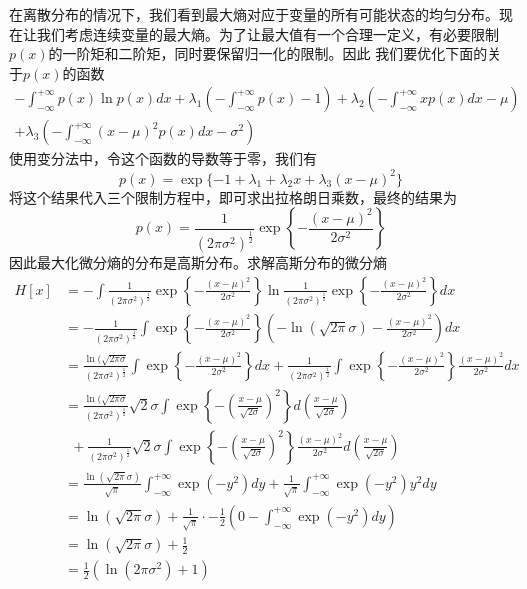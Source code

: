 在离散分布的情况下，我们看到最大熵对应于变量的所有可能状态的均匀分布。现在让我们考虑连续变量的最大熵。为了让最大值有一个合理一定义，有必要限制$p(x)$的一阶矩和二阶矩，同时要保留归一化的限制。因此
我们要优化下面的关于$p(x)$的函数
\begin{equation}
	\begin{aligned}
		-\int_{-\infty}^{+\infty}p(x)\ln p(x)dx+\lambda_1\left(-\int_{-\infty}^{+\infty}p(x)-1 \right)
		+\lambda_2\left(-\int_{-\infty}^{+\infty}xp(x)dx-\mu \right)\\+\lambda_3\left(-\int_{-\infty}^{+\infty}(x-\mu)^2p(x)dx -\sigma^2\right)
	\end{aligned}
\end{equation}
使用变分法中，令这个函数的导数等于零，我们有
\begin{equation}
	p(x)=\exp\{-1+\lambda_1+\lambda_2x+\lambda_3(x-\mu)^2\}
\end{equation}
将这个结果代入三个限制方程中，即可求出拉格朗日乘数，最终的结果为
\begin{equation}
	p(x)=\frac{1}{(2\pi\sigma^2)^{\frac{1}{2}}}\exp\left\{-\frac{(x-\mu)^2}{2\sigma^2} \right\}
\end{equation}
因此最大化微分熵的分布是高斯分布。求解高斯分布的微分熵
\begin{equation}
	\begin{aligned}
		H[x]&=-\int \frac{1}{(2\pi\sigma^2)^{\frac{1}{2}}}\exp\left\{-\frac{(x-\mu)^2}{2\sigma^2} \right\}\ln \frac{1}{(2\pi\sigma^2)^{\frac{1}{2}}}\exp\left\{-\frac{(x-\mu)^2}{2\sigma^2} \right\}dx\\
		&=-\frac{1}{(2\pi\sigma^2)^{\frac{1}{2}}}\int \exp\left\{-\frac{(x-\mu)^2}{2\sigma^2} \right\}\left(-\ln(\sqrt{2\pi}\sigma)-\frac{(x-\mu)^2}{2\sigma^2} \right)dx\\
		&=\frac{\ln(\sqrt{2\pi\sigma}}{(2\pi\sigma^2)^{\frac{1}{2}}}\int \exp\left\{-\frac{(x-\mu)^2}{2\sigma^2} \right\}dx+\frac{1}{(2\pi\sigma^2)^{\frac{1}{2}}}\int \exp\left\{-\frac{(x-\mu)^2}{2\sigma^2} \right\}\frac{(x-\mu)^2}{2\sigma^2}dx\\
		&=\frac{\ln(\sqrt{2\pi\sigma}}{(2\pi\sigma^2)^{\frac{1}{2}}}\sqrt{2}\sigma\int \exp\left\{-\left(\frac{x-\mu}{\sqrt{2\sigma}}\right)^2 \right\}d\left(\frac{x-\mu}{\sqrt{2\sigma}}\right)\\
		&\ \ + \frac{1}{(2\pi\sigma^2)^{\frac{1}{2}}}\sqrt{2}\sigma\int \exp\left\{-\left(\frac{x-\mu}{\sqrt{2\sigma}}\right)^2 \right\}\frac{(x-\mu)^2}{2\sigma^2}d\left(\frac{x-\mu}{\sqrt{2\sigma}}\right)\\
		&=\frac{\ln (\sqrt{2\pi}\sigma)}{\sqrt{\pi}}\int_{-\infty}^{+\infty}\exp (-y^2)dy+\frac{1}{\sqrt{\pi}}\int_{-\infty}^{+\infty}\exp (-y^2)y^2dy\\
		&=\ln(\sqrt{2\pi}\sigma)+\frac{1}{\sqrt{\pi}}\cdot -\frac{1}{2}\left(0-\int_{-\infty}^{+\infty}\exp(-y^2)dy \right)\\
		&=\ln(\sqrt{2\pi}\sigma)+\frac{1}{2}\\
		&=\frac{1}{2}\left(\ln(2\pi \sigma^2)+1\right)
	\end{aligned}
\end{equation}

